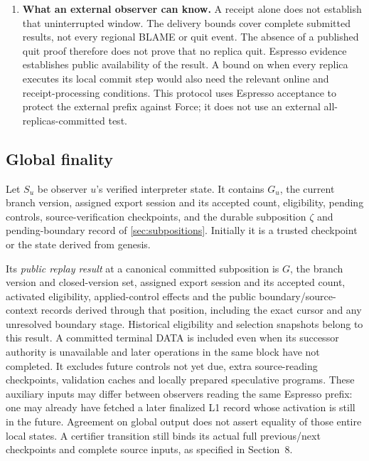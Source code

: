 \documentclass[11pt,a4paper]{article}
\newcommand{\defterm}[1]{\textcolor{rrBlue}{\textit{#1}}}
\newcounter{protocol}
\begin{document}
\begin{enumerate}[label=(\arabic*),itemsep=4pt]
\item \textbf{What an external observer can know.} A receipt alone
does not establish that uninterrupted window. The delivery bounds cover
complete submitted results, not every regional BLAME or quit event. The
absence of a published quit proof therefore does not prove that no replica
quit. Espresso evidence establishes public availability of the result.
A bound on when every replica executes its local commit step would also
need the relevant online and receipt-processing conditions. This protocol
uses Espresso acceptance to protect the external prefix against Force;
it does not use an external all-replicas-committed test.
\end{enumerate}





\subsection{Global finality}
\label{sec:global-finality}
Let $S_u$ be observer $u$'s verified interpreter state. It contains $G_u$,
the current branch version, assigned export session and its accepted
count, eligibility, pending controls, source-verification checkpoints, and the durable
subposition $\zeta$ and pending-boundary record of \cref{sec:subpositions}.
Initially it is a trusted checkpoint or the state derived from genesis.

Its \defterm{public replay result} at a canonical committed subposition is
$G$, the branch version and closed-version set, assigned export session
and its accepted count, activated eligibility, applied-control effects and the
public boundary/source-context records derived through that position,
including the exact cursor and any unresolved boundary stage. Historical
eligibility and selection snapshots belong to this result. A committed
terminal DATA is included even when its successor authority is unavailable
and later operations in the same block have not completed.
It excludes future controls not yet due, extra source-reading checkpoints,
validation caches and locally prepared speculative programs.
These auxiliary inputs may differ between observers reading the same
Espresso prefix: one may already have fetched a later finalized L1 record
whose activation is still in the future. Agreement on global output
does not assert equality of those entire local states.
A certifier transition still binds its actual full previous/next
checkpoints and complete source inputs, as specified in Section~8.
\end{document}
